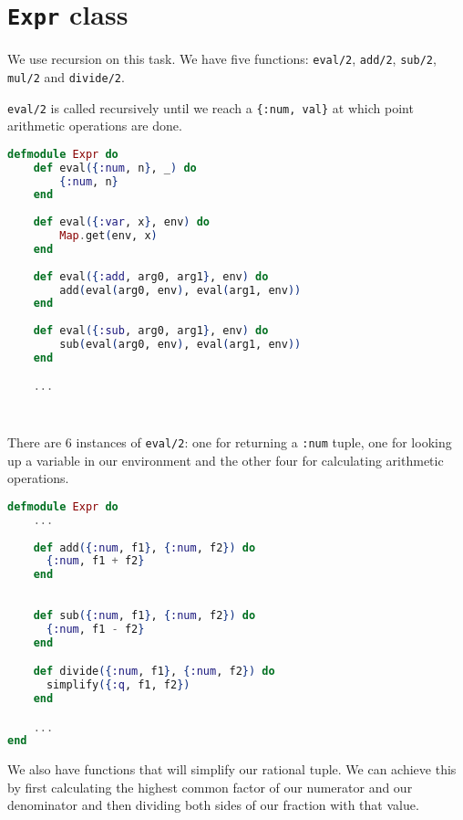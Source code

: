 \section{\texttt{Expr} class}
We use recursion on this task. We have five functions: \texttt{eval/2}, \texttt{add/2}, \texttt{sub/2}, \texttt{mul/2} and \texttt{divide/2}.


\texttt{eval/2} is called recursively until we reach a \texttt{\{:num, val\}} at which point arithmetic operations are done.



\begin{lstlisting}[language=Elixir, caption=For loop that executes each term ]
defmodule Expr do
    def eval({:num, n}, _) do
        {:num, n}
    end
    
    def eval({:var, x}, env) do
        Map.get(env, x)
    end
    
    def eval({:add, arg0, arg1}, env) do
        add(eval(arg0, env), eval(arg1, env))
    end
    
    def eval({:sub, arg0, arg1}, env) do
        sub(eval(arg0, env), eval(arg1, env))
    end

    ...
      
      
\end{lstlisting}

There are 6 instances of \texttt{eval/2}: one for returning a \texttt{:num} tuple, one for looking up a variable in our environment and the other four for calculating arithmetic operations.


\begin{lstlisting}[language=Elixir, caption=For loop that executes each term ]
defmodule Expr do
    ...  
  
    def add({:num, f1}, {:num, f2}) do
      {:num, f1 + f2}
    end
  
  
    def sub({:num, f1}, {:num, f2}) do
      {:num, f1 - f2}
    end

    def divide({:num, f1}, {:num, f2}) do
      simplify({:q, f1, f2})
    end

    ...
end  
\end{lstlisting}

We also have functions that will simplify our rational tuple. We can achieve this by first calculating the highest common factor of our numerator and our denominator and then dividing both sides of our fraction with that value.